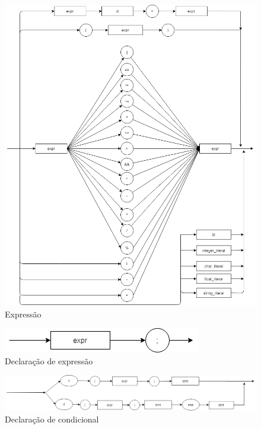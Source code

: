 \documentclass[]{article}
\numberwithin{equation}{section}
\begin{document}
\begin{center}
\begin{figure}[h!]
  \includegraphics[width=\linewidth]{./assets/expr.png}
  \caption{Expressão}
\end{figure}
\end{center}

\begin{center}
\begin{figure}[h!]
  \includegraphics[width=\linewidth]{./assets/expr_stmt.png}
  \caption{Declaração de expressão}
\end{figure}
\end{center}

\begin{center}
\begin{figure}[h!]
  \includegraphics[width=\linewidth]{./assets/if_stmt.png}
  \caption{Declaração de condicional}
\end{figure}
\end{center}
\end{document}
